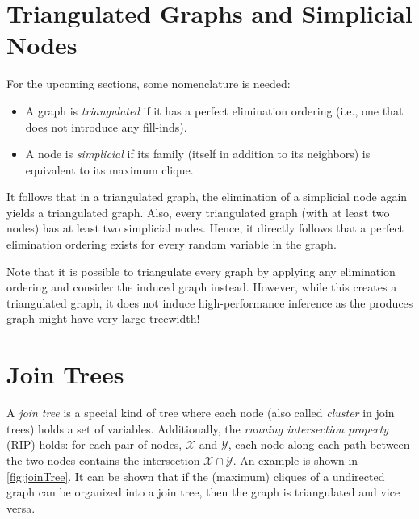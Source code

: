	\section{Triangulated Graphs and Simplicial Nodes}
		For the upcoming sections, some nomenclature is needed:
		\begin{itemize}
			\item A graph is \emph{triangulated} if it has a perfect elimination ordering (i.e., one that does not introduce any fill-inds).
			\item A node is \emph{simplicial} if its family (itself in addition to its neighbors) is equivalent to its maximum clique.
		\end{itemize}
		It follows that in a triangulated graph, the elimination of a simplicial node again yields a triangulated graph. Also, every triangulated graph (with at least two nodes) has at least two simplicial nodes. Hence, it directly follows that a perfect elimination ordering exists for every random variable in the graph.

		Note that it is possible to triangulate every graph by applying any elimination ordering and consider the induced graph instead. However, while this creates a triangulated graph, it does not induce high-performance inference as the produces graph might have very large treewidth!

	\section{Join Trees}
		A \emph{join tree} is a special kind of tree where each node (also called \emph{cluster} in join trees) holds a set of variables. Additionally, the \emph{running intersection property} (RIP) holds: for each pair of nodes, \(\mathcal{X}\) and \(\mathcal{Y}\), each node along each path between the two nodes contains the intersection \( \mathcal{X} \cap \mathcal{Y} \). An example is shown in \autoref{fig:joinTree}. It can be shown that if the (maximum) cliques of a undirected graph can be organized into a join tree, then the graph is triangulated and vice versa.

